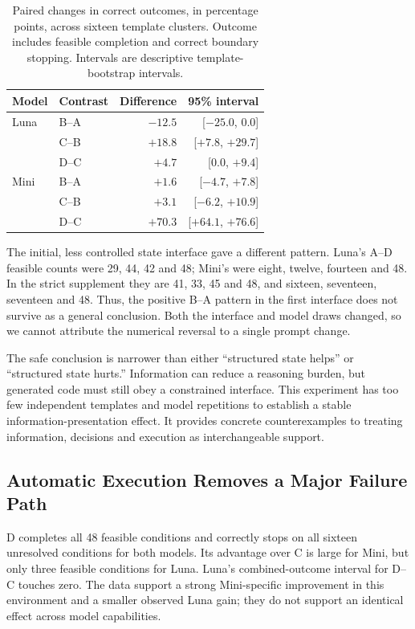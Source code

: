 \documentclass[conference]{IEEEtran}
\newcommand{\smalltable}{\fontsize{8}{9.5}\selectfont}
\begin{document}
\begin{table}[t]
\centering\smalltable
\caption{Paired changes in correct outcomes, in percentage points, across sixteen template clusters. Outcome includes feasible completion and correct boundary stopping. Intervals are descriptive template-bootstrap intervals.}
\label{tab:contrasts}
\begin{tabular}{llrr}
\toprule
Model & Contrast & Difference & 95\% interval \\
\midrule
Luna & B--A & $-12.5$ & [$-25.0$, $0.0$] \\
& C--B & $+18.8$ & [$+7.8$, $+29.7$] \\
& D--C & $+4.7$ & [$0.0$, $+9.4$] \\
Mini & B--A & $+1.6$ & [$-4.7$, $+7.8$] \\
& C--B & $+3.1$ & [$-6.2$, $+10.9$] \\
& D--C & $+70.3$ & [$+64.1$, $+76.6$] \\
\bottomrule
\end{tabular}
\end{table}

The initial, less controlled state interface gave a different pattern. Luna's A--D feasible counts were 29, 44, 42 and 48; Mini's were eight, twelve, fourteen and 48. In the strict supplement they are 41, 33, 45 and 48, and sixteen, seventeen, seventeen and 48. Thus, the positive B--A pattern in the first interface does not survive as a general conclusion. Both the interface and model draws changed, so we cannot attribute the numerical reversal to a single prompt change.

The safe conclusion is narrower than either ``structured state helps'' or ``structured state hurts.'' Information can reduce a reasoning burden, but generated code must still obey a constrained interface. This experiment has too few independent templates and model repetitions to establish a stable information-presentation effect. It provides concrete counterexamples to treating information, decisions and execution as interchangeable support.

\subsection{Automatic Execution Removes a Major Failure Path}
D completes all 48 feasible conditions and correctly stops on all sixteen unresolved conditions for both models. Its advantage over C is large for Mini, but only three feasible conditions for Luna. Luna's combined-outcome interval for D--C touches zero. The data support a strong Mini-specific improvement in this environment and a smaller observed Luna gain; they do not support an identical effect across model capabilities.
\end{document}
